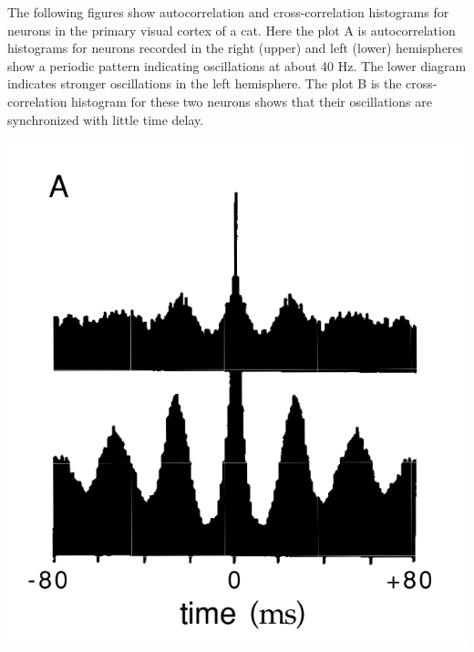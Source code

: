 \begin{exm}
  The following figures show autocorrelation and cross-correlation histograms for neurons in the primary visual cortex of a cat. Here the plot A is autocorrelation histograms for neurons recorded in the right (upper) and left (lower) hemispheres show a periodic pattern indicating oscillations at about 40 Hz. The lower diagram indicates stronger oscillations in the left hemisphere. The plot B is the cross-correlation histogram for these two neurons shows that their oscillations are synchronized with little time delay.%
  \begin{center}
    \label{fig:1.12A}    
    \includegraphics[scale = 0.2]{png/Figure1-12-A.png}
    \label{fig:1.12B} 

\end{center}
\end{exm}
